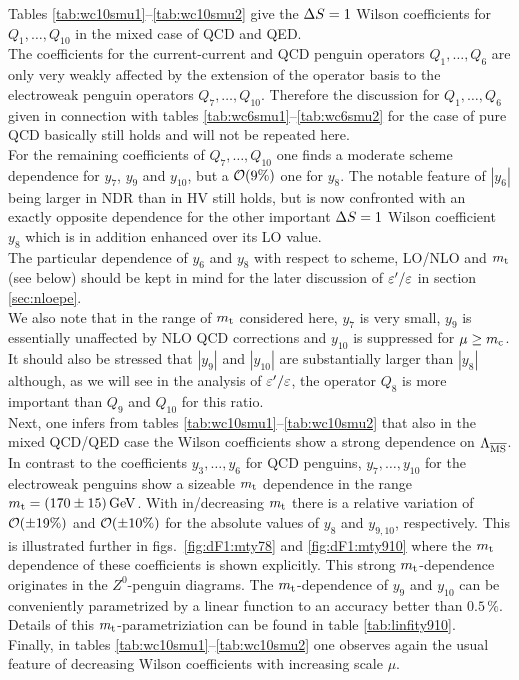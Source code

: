 Tables \ref{tab:wc10smu1}--\ref{tab:wc10smu2} give the $\Delta S=1$ Wilson
coefficients for $Q_1,\ldots,Q_{10}$ in the mixed case of QCD and QED.
\\
The coefficients for the current-current and QCD penguin operators
$Q_1,\ldots,Q_6$ are only very weakly affected by the extension of the
operator basis to the electroweak penguin operators $Q_7,\ldots,Q_{10}$.
Therefore the discussion for $Q_1,\ldots,Q_6$ given in connection with
tables \ref{tab:wc6smu1}--\ref{tab:wc6smu2} for the case of pure
QCD basically still holds and will not be repeated here.
\\
For the remaining coefficients of $Q_7,\ldots,Q_{10}$ one finds a
moderate scheme dependence for $y_7$, $y_9$ and $y_{10}$, but a ${\cal O}(9\%)$
one for $y_8$. The notable feature of $|y_6|$ being larger in NDR than in
HV still holds, but is now confronted with an exactly opposite
dependence for the other important $\Delta S=1$ Wilson coefficient $y_8$ which
is in addition enhanced over its LO value.
\\
The particular dependence of $y_6$ and $y_8$ with respect to scheme,
LO/NLO and $m_{\rm t}$ (see below) should be kept in mind for the later
discussion of $\varepsilon'/\varepsilon$ in section \ref{sec:nloepe}.
\\
We also note that in the range of $m_{\rm t}$ considered here, $y_7$ is very
small, $y_9$ is essentially unaffected by NLO QCD corrections and
$y_{10}$ is suppressed for $\mu \ge m_{\rm c}$. It should also be stressed
that $|y_9|$  and $|y_{10}|$ are substantially larger than $|y_8|$
although, as we will see in the analysis of $\varepsilon'/\varepsilon$, the operator $Q_8$
is more important than $Q_9$ and $Q_{10}$ for this ratio.
\\
Next, one infers from tables \ref{tab:wc10smu1}--\ref{tab:wc10smu2} 
that also in the mixed QCD/QED case the Wilson coefficients show a
strong dependence on $\Lambda_{\overline{\rm MS}}$.
\\
In contrast to the coefficients $y_3,\ldots,y_6$ for QCD penguins,
$y_7,\ldots,y_{10}$ for the electroweak penguins show a sizeable
$m_{\rm t}$ dependence in the range $m_{\rm t} = (170 \pm 15)\, {\rm GeV}$. With
in/decreasing $m_{\rm t}$ there is a relative variation of ${\cal O}(\pm 19\%)$
and ${\cal O}(\pm 10\%)$ for the absolute values of $y_8$ and $y_{9,10}$,
respectively.
This is illustrated further in figs.\ \ref{fig:dF1:mty78} and
\ref{fig:dF1:mty910} where the $m_{\rm t}$ dependence of these coefficients is
shown explicitly. This strong $m_{\rm t}$-dependence originates in the
$Z^0$-penguin diagrams.
The $m_{\rm t}$-dependence of $y_9$ and $y_{10}$ can be conveniently
parametrized by a linear function to an accuracy better than $0.5\,\%$.
Details of this $m_{\rm t}$-parametriziation can be found in table
\ref{tab:linfity910}.
\\
Finally, in tables \ref{tab:wc10smu1}--\ref{tab:wc10smu2} one
observes again the usual feature of decreasing Wilson coefficients
with increasing scale $\mu$.

